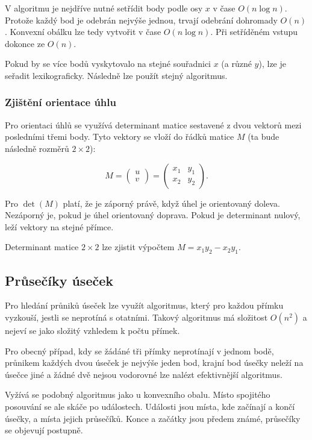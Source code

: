 V algoritmu je nejdříve nutné setřídit body podle osy $x$ v čase $O(n \log{n})$.
Protože každý bod je odebrán nejvýše jednou, trvají odebrání dohromady $O(n)$.
Konvexní obálku lze tedy vytvořit v čase $O(n \log{n})$.
Při setříděném vstupu dokonce ze $O(n)$.

Pokud by se více bodů vyskytovalo na stejné souřadnici $x$ (a různé $y$), lze je seřadit lexikograficky.
Následně lze použít stejný algoritmus.

\subsubsection{Zjištění orientace úhlu}

Pro orientaci úhlů se využívá determinant matice sestavené z dvou vektorů mezi posledními třemi body.
Tyto vektory se vloží do řádků matice $M$ (ta bude následně rozměrů $2 \times 2$):

\[
    M
    =
    \begin{pmatrix} u \\ v \end{pmatrix}
    =
    \begin{pmatrix}
     x_1 & y_1 \\
     x_2 & y_2
    \end{pmatrix}.
\]

Pro $\det (M)$ platí, že je záporný právě, když úhel je orientovaný doleva.
Nezáporný je, pokud je úhel orientovaný doprava.
Pokud je determinant nulový, leží vektory na stejné přímce.

Determinant matice $2 \times 2$ lze zjistit výpočtem $M = x_1y_2 - x_2y_1$.

\subsection{Průsečíky úseček}

Pro hledání průniků úseček lze využít algoritmus, který pro každou přímku vyzkouší, jestli se neprotíná s otatními.
Takový algoritmus má složitost $O(n^2)$ a nejeví se jako složitý vzhledem k počtu přímek.

Pro obecný případ, kdy se žádáné tři přímky neprotínají v jednom bodě, průnikem každých dvou úseček je nejvýše jeden bod, krajní bod úsečky neleží na úsečce jiné a žádné dvě nejsou vodorovné lze nalézt efektivnější algoritmus.

Vyžívá se podobný algoritmus jako u konvexního obalu.
Místo spojitého posouvání se ale skáče po událostech.
Události jsou místa, kde začínají a končí úsečky, a místa jejich průsečíků.
Konce a začátky jsou předem známé, průsečíky se objevují postupně.

